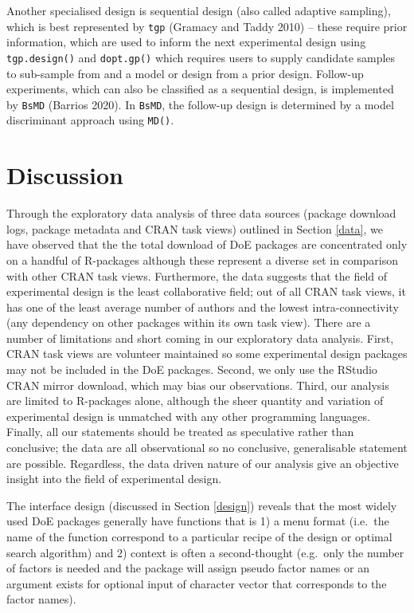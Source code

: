 \documentclass{article}
\begin{document}
Another specialised design is sequential design (also called adaptive
sampling), which is best represented by \texttt{tgp} (Gramacy and Taddy
2010) -- these require prior information, which are used to inform the
next experimental design using \texttt{tgp.design()} and
\texttt{dopt.gp()} which requires users to supply candidate samples to
sub-sample from and a model or design from a prior design. Follow-up
experiments, which can also be classified as a sequential design, is
implemented by \texttt{BsMD} (Barrios 2020). In \texttt{BsMD}, the
follow-up design is determined by a model discriminant approach using
\texttt{MD()}.

\hypertarget{discussion}{%
\section{Discussion}\label{discussion}}

Through the exploratory data analysis of three data sources (package
download logs, package metadata and CRAN task views) outlined in Section
\ref{data}, we have observed that the the total download of DoE packages
are concentrated only on a handful of R-packages although these
represent a diverse set in comparison with other CRAN task views.
Furthermore, the data suggests that the field of experimental design is
the least collaborative field; out of all CRAN task views, it has one of
the least average number of authors and the lowest intra-connectivity
(any dependency on other packages within its own task view). There are a
number of limitations and short coming in our exploratory data analysis.
First, CRAN task views are volunteer maintained so some experimental
design packages may not be included in the DoE packages. Second, we only
use the RStudio CRAN mirror download, which may bias our observations.
Third, our analysis are limited to R-packages alone, although the sheer
quantity and variation of experimental design is unmatched with any
other programming languages. Finally, all our statements should be
treated as speculative rather than conclusive; the data are all
observational so no conclusive, generalisable statement are possible.
Regardless, the data driven nature of our analysis give an objective
insight into the field of experimental design.

The interface design (discussed in Section \ref{design}) reveals that
the most widely used DoE packages generally have functions that is 1) a
menu format (i.e.~the name of the function correspond to a particular
recipe of the design or optimal search algorithm) and 2) context is
often a second-thought (e.g.~only the number of factors is needed and
the package will assign pseudo factor names or an argument exists for
optional input of character vector that corresponds to the factor
names).
\end{document}
